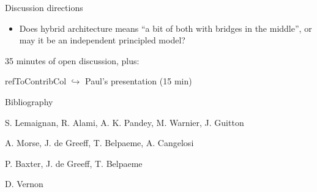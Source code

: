 \documentclass[compress]{beamer}
\newcommand{\refToContrib}[1]{%
    \begin{beamercolorbox}[wd=\linewidth,ht=2ex,dp=0.7ex]{refToContribCol}%
    \hspace{0.5em}$\hookrightarrow$ #1%
    \end{beamercolorbox}%
}%
\begin{document}
\begin{frame}{Discussion directions}

    \begin{itemize}
        \item Does {\Medium hybrid architecture} means ``a bit of
    both with bridges in the middle'', or may it be an independent principled
    model?
    \end{itemize}

    35 minutes of open discussion, plus:
    \refToContrib{Paul's presentation (15 min)}

\end{frame}

\begin{frame}{Bibliography}
\begin{thebibliography}{10}

    \beamertemplatearticlebibitems
    S. Lemaignan, R. Alami, A. K. Pandey, M. Warnier, J. Guitton
    \newblock {}

    \beamertemplatearticlebibitems
    A. Morse, J. de Greeff, T. Belpaeme, A. Cangelosi
    \newblock {}

    \beamertemplatearticlebibitems
    P. Baxter, J. de Greeff, T. Belpaeme
    \newblock {}

    \beamertemplatebookbibitems
    D. Vernon
    \newblock {}


  \end{thebibliography}
\end{frame}
\end{document}
